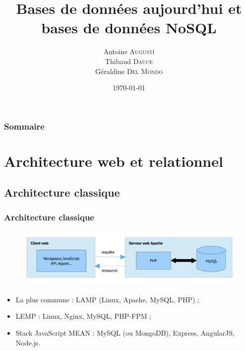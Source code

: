 \documentclass[handout]{beamer}
\title{
	Bases de données aujourd'hui et bases de données NoSQL
}
\author{
	Antoine \textsc{Augusti}\\
	\vspace{5px}
	Thibaud \textsc{Dauce} \\
	\vspace{5px}
	Géraldine \textsc{Del Mondo} \\
}
\date{\today}
\begin{document}
	\begin{frame}[plain]
		\titlepage
	\end{frame}

	\begin{frame}[plain]
		\frametitle{Sommaire}
		\tableofcontents
	\end{frame}

	\section{Architecture web et relationnel}
		\subsection{Architecture classique}
		\begin{frame}
			\frametitle{Architecture classique}

			\begin{figure}[htb]
				\includegraphics[width=1\textwidth]{images/LAMP.png}
			\end{figure}

			\begin{itemize}
				\item La plus commune : LAMP (Linux, Apache, MySQL, PHP) ;
				\item LEMP : Linux, Nginx, MySQL, PHP-FPM ;
				\item Stack JavaScript MEAN : MySQL (ou MongoDB), Express, AngularJS, Node.js.
			\end{itemize}

		\end{frame}

\end{document}

